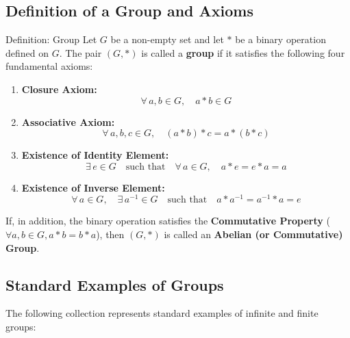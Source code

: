 \documentclass[11pt,a4paper]{article}
\begin{document}
\subsection{Definition of a Group and Axioms}

\begin{defbox}{Definition: Group}
Let $G$ be a non-empty set and let $*$ be a binary operation defined on $G$. The pair $(G, *)$ is called a \textbf{group} if it satisfies the following four fundamental axioms:
\begin{enumerate}
    \item \textbf{Closure Axiom:}
    \begin{equation}
        \forall\, a, b \in G, \quad a * b \in G
    \end{equation}
    
    \item \textbf{Associative Axiom:}
    \begin{equation}
        \forall\, a, b, c \in G, \quad (a * b) * c = a * (b * c)
    \end{equation}
    
    \item \textbf{Existence of Identity Element:}
    \begin{equation}
        \exists\, e \in G \quad \text{such that} \quad \forall\, a \in G, \quad a * e = e * a = a
    \end{equation}
    
    \item \textbf{Existence of Inverse Element:}
    \begin{equation}
        \forall\, a \in G, \quad \exists\, a^{-1} \in G \quad \text{such that} \quad a * a^{-1} = a^{-1} * a = e
    \end{equation}
\end{enumerate}
If, in addition, the binary operation satisfies the \textbf{Commutative Property} ($\forall a, b \in G, a * b = b * a$), then $(G, *)$ is called an \textbf{Abelian (or Commutative) Group}.
\end{defbox}

\subsection{Standard Examples of Groups}

The following collection represents standard examples of infinite and finite groups:
\end{document}
